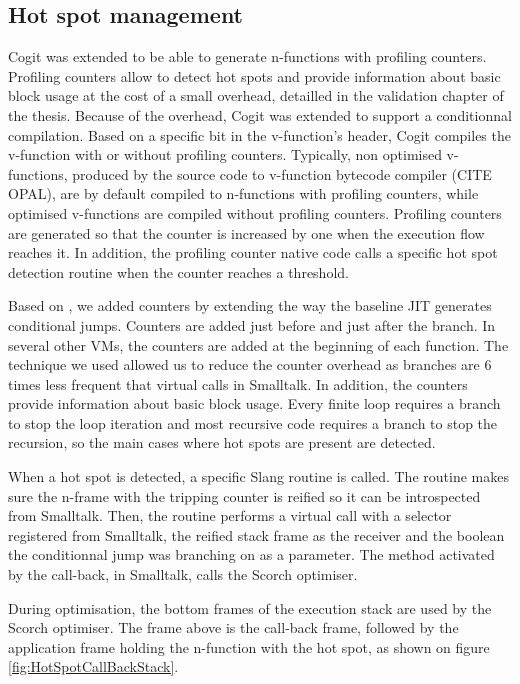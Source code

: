 \documentclass[a4paper,12pt,twoside]{../includes/ThesisStyle}
\begin{document}
\subsection{Hot spot management}

Cogit was extended to be able to generate n-functions with profiling counters. Profiling counters allow to detect hot spots and provide information about basic block usage at the cost of a small overhead, detailled in the validation chapter of the thesis. Because of the overhead, Cogit was extended to support a conditionnal compilation. Based on a specific bit in the v-function's header, Cogit compiles the v-function with or without profiling counters. Typically, non optimised v-functions, produced by the source code to v-function bytecode compiler (CITE OPAL), are by default compiled to n-functions with profiling counters, while optimised v-functions are compiled without profiling counters. Profiling counters are generated so that the counter is increased by one when the execution flow reaches it. In addition, the profiling counter native code calls a specific hot spot detection routine when the counter reaches a threshold.


Based on \cite{Arn02}, we added counters by extending the way the baseline JIT generates conditional jumps. Counters are added just before and just after the branch. In several other VMs, the counters are added at the beginning of each function. The technique we used allowed us to reduce the counter overhead as branches are 6 times less frequent that virtual calls in Smalltalk. In addition, the counters provide information about basic block usage. Every finite loop requires a branch to stop the loop iteration and most recursive code requires a branch to stop the recursion, so the main cases where hot spots are present are detected.

When a hot spot is detected, a specific Slang routine is called. The routine makes sure the n-frame with the tripping counter is reified so it can be introspected from Smalltalk. Then, the routine performs a virtual call with a selector registered from Smalltalk, the reified stack frame as the receiver and the boolean the conditionnal jump was branching on as a parameter. The method activated by the call-back, in Smalltalk, calls the Scorch optimiser.

During optimisation, the bottom frames of the execution stack are used by the Scorch optimiser. The frame above is the call-back frame, followed by the application frame holding the n-function with the hot spot, as shown on figure \ref{fig:HotSpotCallBackStack}.
\end{document}
